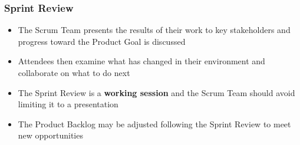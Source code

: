 \begin{frame}
    \frametitle{Sprint Review}
    \begin{itemize}
        \setlength\itemsep{0.7em}
        \item The Scrum Team presents the results of their work to key stakeholders and progress toward the Product Goal is discussed
        \item Attendees then examine what has changed in their environment and collaborate on what to do next
        \item<2-> The Sprint Review is a \textbf{working session} and the Scrum Team should avoid limiting it to a presentation
	    \item<2-> The Product Backlog may be adjusted following the Sprint Review to meet new opportunities
    \end{itemize}
\end{frame}

